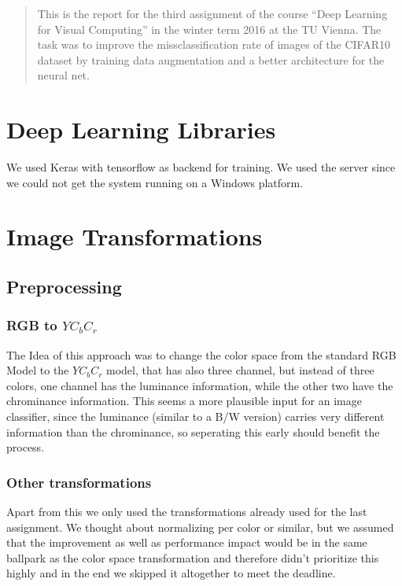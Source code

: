 \newcommand{\ttitle}{Image Classification with CNN}
\hyphenation{}
\maketitle
\begin{abstract}
This is the report for the third assignment of the course ``Deep Learning for Visual Computing'' in the winter term 2016 at the TU Vienna. The task was to improve the missclassification rate of images of  the CIFAR10~\cite{CIFAR10} dataset by training data augmentation and a better architecture for the neural net.
\end{abstract}

\section{Deep Learning Libraries}
We used Keras with tensorflow as backend for training. We used the server since we could not get the system running on a Windows platform. 

\section{Image Transformations}
\subsection{Preprocessing}
\subsubsection{RGB to $YC_bC_r$}
The Idea of this approach was to change the color space from the standard RGB Model to the $YC_bC_r$ model, that has also three channel, but instead of three colors, one channel has the luminance information, while the other two have the chrominance information. This seems a more plausible input for an image classifier, since the luminance (similar to a B/W version) carries very different information than the chrominance, so seperating this early should benefit the process. 

\subsubsection{Other transformations}
Apart from this we only used the transformations already used for the last assignment. We thought about normalizing per color or similar, but we assumed that the improvement as well as performance impact would be in the same ballpark as the color space transformation and therefore didn't prioritize this highly and in the end we skipped it altogether to meet the deadline.


